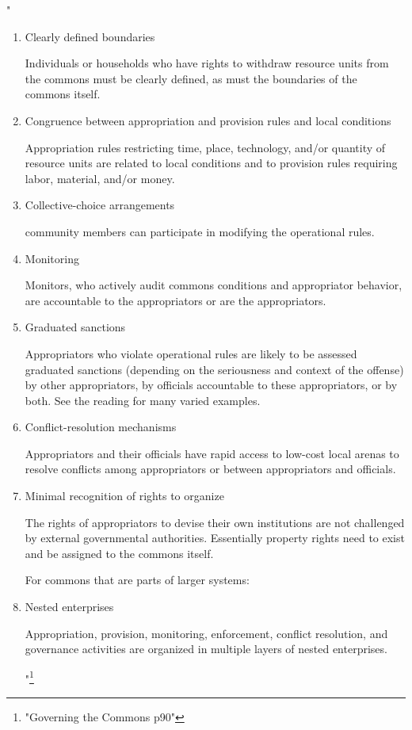 \documentclass{article}
\begin{document}
"
\begin{enumerate}

\item {Clearly defined boundaries}

Individuals or households who have rights to withdraw resource units from the commons must be clearly defined, as must the boundaries of the commons itself.


\item{ Congruence between appropriation and provision rules and local conditions}

 Appropriation rules restricting time, place, technology, and/or quantity of resource units are related to local conditions and to provision rules requiring labor, material, and/or money.


\item{Collective-choice arrangements}

community members can participate in modifying the operational rules.


\item{Monitoring}

Monitors, who actively audit commons conditions and appropriator behavior, are accountable to the appropriators or are the appropriators.


\item{Graduated sanctions}

Appropriators who violate operational rules are likely to be assessed graduated sanctions (depending on the seriousness and context of the offense) by other appropriators, by officials accountable to these appropriators, or by both. See the reading for many varied examples. 


\item{Conflict-resolution mechanisms}

Appropriators and their officials have rapid access to low-cost local arenas to resolve conflicts among appropriators or between appropriators and officials.



\item{Minimal recognition of rights to organize}

The rights of appropriators to devise their own institutions are not challenged by external governmental authorities. Essentially property rights need to exist and be assigned to the commons itself. 

For commons that are parts of larger systems:

\item{Nested enterprises}

Appropriation, provision, monitoring, enforcement, conflict resolution, and governance activities are organized in multiple layers of nested enterprises.

"\footnote{"Governing the Commons p90"}

\end{enumerate}
\end{document}
